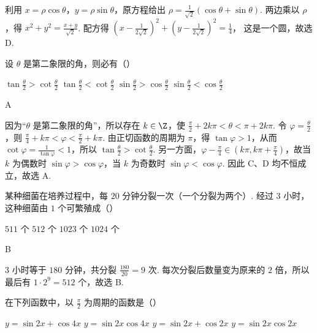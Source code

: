 \begin{solution}
利用 \(x=\rho\cos\theta\)，\(y=\rho\sin\theta\)，原方程给出 \(\rho=\frac{1}{\sqrt{2}}\left(\cos\theta+\sin\theta\right)\). 两边乘以 \(\rho\)，得 \(x^2+y^2=\frac{x+y}{\sqrt{2}}\). 配方得 \(\left(x-\frac{1}{2\sqrt{2}}\right)^2+\left(y-\frac{1}{2\sqrt{2}}\right)^2=\frac14\)，
这是一个圆，故选 D.
\end{solution}

\begin{problem}
设 \(\theta\) 是第二象限的角，则必有（\quad）

\choices
    {\(\tan \frac{\theta}{2} > \cot \frac{\theta}{2}\)}
    {\(\tan \frac{\theta}{2} < \cot \frac{\theta}{2}\)}
    {\(\sin \frac{\theta}{2} > \cos \frac{\theta}{2}\)}
    {\(\sin \frac{\theta}{2} < \cos \frac{\theta}{2}\)}
\end{problem}

\begin{answer}
A
\end{answer}

\begin{solution}
因为“\(\theta\) 是第二象限的角”，所以存在 \(k\in\Z\)，使
\(\frac{\pi}{2}+2k\pi<\theta<\pi+2k\pi\). 令 \(\varphi=\frac{\theta}{2}\)，则
\(\frac{\pi}{4}+k\pi<\varphi<\frac{\pi}{2}+k\pi\).
由正切函数的周期为 \(\pi\)，得 \(\tan\varphi>1\)，从而 \(\cot\varphi=\frac{1}{\tan\varphi}<1\)，所以
\(\tan\frac{\theta}{2}>\cot\frac{\theta}{2}\).
另一方面，\(\varphi-\frac{\pi}{4}\in(k\pi,k\pi+\frac{\pi}{4})\)，故当 \(k\) 为偶数时 \(\sin\varphi>\cos\varphi\)，当 \(k\) 为奇数时 \(\sin\varphi<\cos\varphi\). 因此 C、D 均不恒成立，故选 A.
\end{solution}

\begin{problem}
某种细菌在培养过程中，每 \(20\) 分钟分裂一次（一个分裂为两个）. 经过 \(3\) 小时，这种细菌由 \(1\) 个可繁殖成（\quad）

\choices
    {\(511\) 个}
    {\(512\) 个}
    {\(1023\) 个}
    {\(1024\) 个}
\end{problem}

\begin{answer}
B
\end{answer}

\begin{solution}
3 小时等于 \(180\) 分钟，共分裂 \(\frac{180}{20}=9\) 次. 每次分裂后数量变为原来的 \(2\) 倍，所以最后有 \(1\cdot 2^9=512\) 个，故选 B.
\end{solution}

\begin{problem}
在下列函数中，以 \(\frac{\pi}{2}\) 为周期的函数是（\quad）

\choices
    {\(y = \sin 2x + \cos 4x\)}
    {\(y = \sin 2x\cos 4x \)}
    {\(y = \sin 2x + \cos 2x \)}
    {\(y = \sin 2x\cos 2x \)}
\end{problem}

